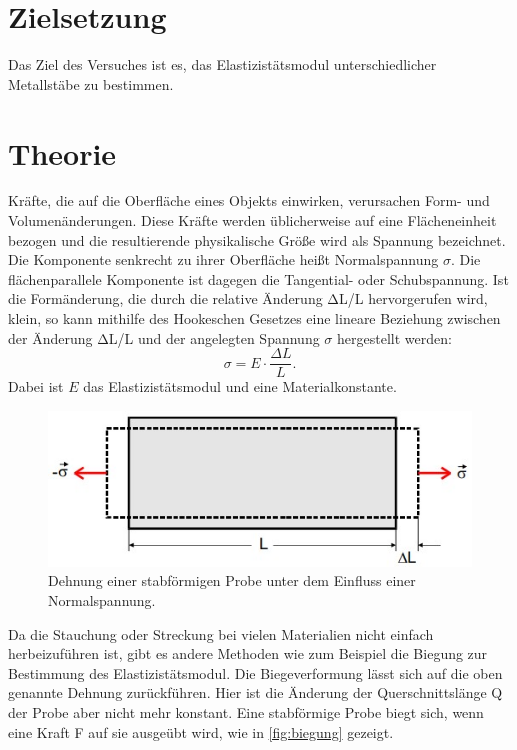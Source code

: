 \section{Zielsetzung}
\label{sec:Zielsetzung}
Das Ziel des Versuches ist es, das Elastizistätsmodul unterschiedlicher Metallstäbe zu bestimmen.

\section{Theorie}
\label{sec:Theorie}

Kräfte, die auf die Oberfläche eines Objekts einwirken, verursachen Form- und Volumenänderungen. Diese Kräfte werden üblicherweise auf eine Flächeneinheit bezogen und die resultierende physikalische Größe wird als Spannung bezeichnet. 
Die Komponente senkrecht zu ihrer Oberfläche heißt Normalspannung $\sigma$.
Die flächenparallele Komponente ist dagegen die Tangential- oder Schubspannung. 
Ist die Formänderung, die durch die relative Änderung ΔL/L hervorgerufen wird, klein, so kann mithilfe des Hookeschen Gesetzes eine lineare Beziehung zwischen
der Änderung ΔL/L und der angelegten Spannung $\sigma$ hergestellt werden:
\begin{equation}\label{eq:hook}
    \sigma = E \cdot \frac{\Delta L}{L}.
\end{equation}
Dabei ist $E$ das Elastizistätsmodul und eine Materialkonstante.
\begin{figure}[H]
    \includegraphics[width=\linewidth]{img/abb1.jpg}
    \caption{Dehnung einer stabförmigen Probe unter dem Einfluss einer Normalspannung.\cite{V103}}
    \label{fig:hook}
\end{figure}
Da die Stauchung oder Streckung bei vielen Materialien nicht einfach herbeizuführen ist, gibt es andere Methoden wie zum Beispiel die 
Biegung zur Bestimmung des Elastizistätsmodul.
Die Biegeverformung lässt sich auf die oben genannte Dehnung zurückführen. Hier ist die Änderung der Querschnittslänge Q der Probe aber nicht mehr konstant. 
Eine stabförmige Probe biegt sich, wenn eine Kraft F auf sie ausgeübt wird, wie in \autoref{fig:biegung} gezeigt.
